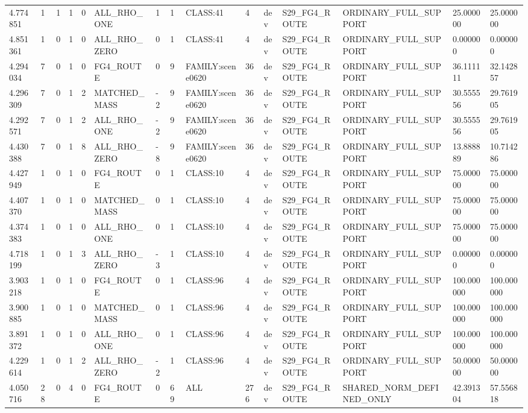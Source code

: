 \begin{tabular}{lllllllllllllll}
4.774851 & 1 & 1 & 1 & 0 & ALL\_RHO\_ONE & 1 & 1 & CLASS:41 & 4 & dev & S29\_FG4\_ROUTE & ORDINARY\_FULL\_SUPPORT & 25.000000 & 25.000000 \\
4.851361 & 1 & 0 & 1 & 0 & ALL\_RHO\_ZERO & 0 & 1 & CLASS:41 & 4 & dev & S29\_FG4\_ROUTE & ORDINARY\_FULL\_SUPPORT & 0.000000 & 0.000000 \\
4.294034 & 7 & 0 & 1 & 0 & FG4\_ROUTE & 0 & 9 & FAMILY:scene0620 & 36 & dev & S29\_FG4\_ROUTE & ORDINARY\_FULL\_SUPPORT & 36.111111 & 32.142857 \\
4.296309 & 7 & 0 & 1 & 2 & MATCHED\_MASS & -2 & 9 & FAMILY:scene0620 & 36 & dev & S29\_FG4\_ROUTE & ORDINARY\_FULL\_SUPPORT & 30.555556 & 29.761905 \\
4.292571 & 7 & 0 & 1 & 2 & ALL\_RHO\_ONE & -2 & 9 & FAMILY:scene0620 & 36 & dev & S29\_FG4\_ROUTE & ORDINARY\_FULL\_SUPPORT & 30.555556 & 29.761905 \\
4.430388 & 7 & 0 & 1 & 8 & ALL\_RHO\_ZERO & -8 & 9 & FAMILY:scene0620 & 36 & dev & S29\_FG4\_ROUTE & ORDINARY\_FULL\_SUPPORT & 13.888889 & 10.714286 \\
4.427949 & 1 & 0 & 1 & 0 & FG4\_ROUTE & 0 & 1 & CLASS:10 & 4 & dev & S29\_FG4\_ROUTE & ORDINARY\_FULL\_SUPPORT & 75.000000 & 75.000000 \\
4.407370 & 1 & 0 & 1 & 0 & MATCHED\_MASS & 0 & 1 & CLASS:10 & 4 & dev & S29\_FG4\_ROUTE & ORDINARY\_FULL\_SUPPORT & 75.000000 & 75.000000 \\
4.374383 & 1 & 0 & 1 & 0 & ALL\_RHO\_ONE & 0 & 1 & CLASS:10 & 4 & dev & S29\_FG4\_ROUTE & ORDINARY\_FULL\_SUPPORT & 75.000000 & 75.000000 \\
4.718199 & 1 & 0 & 1 & 3 & ALL\_RHO\_ZERO & -3 & 1 & CLASS:10 & 4 & dev & S29\_FG4\_ROUTE & ORDINARY\_FULL\_SUPPORT & 0.000000 & 0.000000 \\
3.903218 & 1 & 0 & 1 & 0 & FG4\_ROUTE & 0 & 1 & CLASS:96 & 4 & dev & S29\_FG4\_ROUTE & ORDINARY\_FULL\_SUPPORT & 100.000000 & 100.000000 \\
3.900885 & 1 & 0 & 1 & 0 & MATCHED\_MASS & 0 & 1 & CLASS:96 & 4 & dev & S29\_FG4\_ROUTE & ORDINARY\_FULL\_SUPPORT & 100.000000 & 100.000000 \\
3.891372 & 1 & 0 & 1 & 0 & ALL\_RHO\_ONE & 0 & 1 & CLASS:96 & 4 & dev & S29\_FG4\_ROUTE & ORDINARY\_FULL\_SUPPORT & 100.000000 & 100.000000 \\
4.229614 & 1 & 0 & 1 & 2 & ALL\_RHO\_ZERO & -2 & 1 & CLASS:96 & 4 & dev & S29\_FG4\_ROUTE & ORDINARY\_FULL\_SUPPORT & 50.000000 & 50.000000 \\
4.050716 & 28 & 0 & 4 & 0 & FG4\_ROUTE & 0 & 69 & ALL & 276 & dev & S29\_FG4\_ROUTE & SHARED\_NORM\_DEFINED\_ONLY & 42.391304 & 57.556818 \\

\end{tabular}
